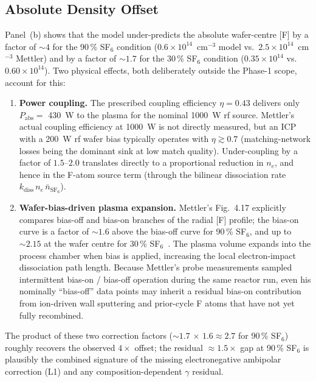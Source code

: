 \subsection{Absolute Density Offset}

Panel~(b) shows that the model under-predicts the absolute wafer-centre [F] by a factor of $\sim 4$ for the 90\,\% SF$_6$ condition ($0.6\times10^{14}$~cm$^{-3}$ model vs.\ $2.5\times10^{14}$~cm$^{-3}$ Mettler) and by a factor of $\sim 1.7$ for the 30\,\% SF$_6$ condition ($0.35\times10^{14}$ vs.\ $0.60\times10^{14}$).  Two physical effects, both deliberately outside the Phase-1 scope, account for this:

\begin{enumerate}
  \item \textbf{Power coupling.}  The prescribed coupling efficiency $\eta = 0.43$ delivers only $P_\mathrm{abs} = $ \SI{430}{\watt} to the plasma for the nominal \SI{1000}{\watt} rf source.  Mettler's actual coupling efficiency at \SI{1000}{\watt} is not directly measured, but an ICP with a \SI{200}{\watt} rf wafer bias typically operates with $\eta \gtrsim 0.7$ (matching-network losses being the dominant sink at low match quality).  Under-coupling by a factor of $1.5$--$2.0$ translates directly to a proportional reduction in $n_e$, and hence in the F-atom source term (through the bilinear dissociation rate $k_\mathrm{diss}\,n_e\,\bar{n}_{\mathrm{SF}_6}$).
  \item \textbf{Wafer-bias-driven plasma expansion.}  Mettler's Fig.~4.17 explicitly compares bias-off and bias-on branches of the radial [F] profile; the bias-on curve is a factor of $\sim 1.6$ above the bias-off curve for 90\,\% SF$_6$, and up to $\sim 2.15$ at the wafer centre for 30\,\% SF$_6$~\cite{Mettler2025}.  The plasma volume expands into the process chamber when bias is applied, increasing the local electron-impact dissociation path length.  Because Mettler's probe measurements sampled intermittent bias-on / bias-off operation during the same reactor run, even his nominally ``bias-off'' data points may inherit a residual bias-on contribution from ion-driven wall sputtering and prior-cycle F atoms that have not yet fully recombined.
\end{enumerate}

The product of these two correction factors ($\sim 1.7\,\times\,1.6 \approx 2.7$ for 90\,\% SF$_6$) roughly recovers the observed $4\times$ offset; the residual $\approx 1.5\times$ gap at 90\,\% SF$_6$ is plausibly the combined signature of the missing electronegative ambipolar correction (L1) and any composition-dependent $\gamma$ residual.

